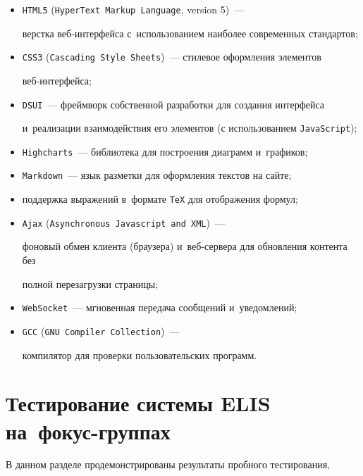 \begin{itemize}


\item \verb"HTML5" (\verb"HyperText Markup Language", version 5)~---  


верстка веб-ин\-тер\-фей\-са с~использованием наиболее современных стандартов;


\item \verb"СSS3" (\verb"Cascading Style Sheets")~---  стилевое оформления элементов 


веб-ин\-тер\-фейса;


\item \verb"DSUI"~--- фреймворк собственной разработки для создания интерфейса 


и~реализации взаимодействия его элементов (с использованием \verb"JavaScript");


\item \verb"Highcharts"~--- библиотека для построения диаграмм и~графиков;


\item \verb"Markdown"~--- язык разметки для оформления текстов на сайте;


\item поддержка выражений в~формате \verb"TeX"  для отображения формул;


\item \verb"Ajax" (\verb"Asynchronous Javascript and XML")~--- 


фоновый обмен клиента (браузера) и~веб-сер\-ве\-ра для обновления контента без 


полной перезагрузки страницы;


\item \verb"WebSocket"~--- мгновенная передача сообщений и~уведомлений;


\item \verb"GCC" (\verb"GNU Compiler Collection")~--- 


компилятор для проверки пользовательских программ.


\end{itemize}





\section{Тестирование системы ELIS на~фокус-группах}





В данном разделе продемонстрированы результаты пробного тестирования, 


